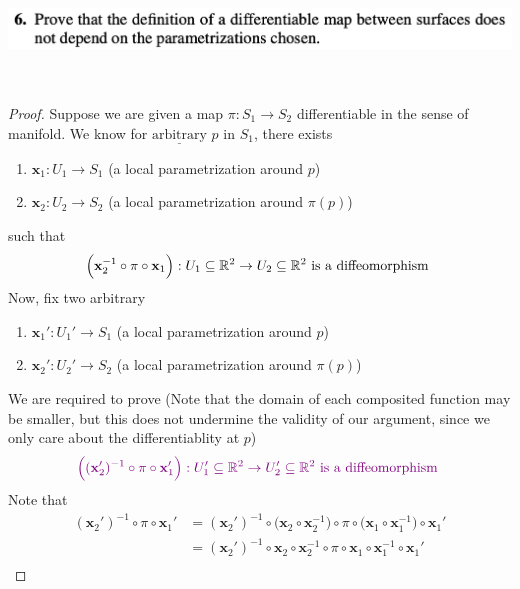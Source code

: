 \documentclass{report}
\begin{document}
\begin{question}{}{}
\includegraphics[height=3cm,width=18cm]{HW3a4}
\end{question}
\begin{proof}
Suppose we are given a map $\pi:S_1\rightarrow S_2$ differentiable in the sense of manifold. We know for $\underline{\text{arbitrary}}$ $p$ in  $S_1$, there exists 
\begin{enumerate}[label=(\alph*)]
  \item $\textbf{x}_1:U_1\rightarrow S_1$ (a local parametrization around $p$)
  \item $\textbf{x}_2:U_2\rightarrow S_2$ (a local parametrization around $\pi(p)$)
\end{enumerate}
such that 
\begin{align}
\label{dife}
\Big(\textbf{x}_2^{-1}\circ \pi \circ \textbf{x}_1 \Big):U_1\subseteq \mathbb{R}^2\rightarrow U_2\subseteq \mathbb{R}^2\text{ is a diffeomorphism }
\end{align}
Now, fix two arbitrary 
\begin{enumerate}[label=(\alph*)]
  \item  $\textbf{x}_1':U_1'\rightarrow S_1$ (a local parametrization around $p$)
  \item $\textbf{x}_2':U_2'\rightarrow S_2$ (a local parametrization around $\pi(p)$)
\end{enumerate}
We are required to prove (Note that the domain of each composited function may be smaller, but this does not undermine the validity of our argument, since we only care about the differentiablity at $p$) 
\begin{align*}
\textcolor{violet}{\Big((\textbf{x}_2')^{-1}\circ \pi \circ \textbf{x}_1' \Big):U_1'\subseteq \mathbb{R}^2\rightarrow U_2'\subseteq \mathbb{R}^2\text{ is a diffeomorphism  }}
\end{align*}
Note that 
\begin{align*}
  (\textbf{x}_2')^{-1}\circ \pi \circ \textbf{x}_1' &=(\textbf{x}_2')^{-1}\circ \big( \textbf{x}_2 \circ  \textbf{x}_2^{-1} \big)\circ \pi \circ \big( \textbf{x}_1 \circ \textbf{x}_1^{-1}  \big)\circ  \textbf{x}_1'\\
  &=(\textbf{x}_2')^{-1}\circ \textbf{x}_2 \circ  \textbf{x}_2^{-1} \circ \pi \circ  \textbf{x}_1 \circ \textbf{x}_1^{-1} \circ  \textbf{x}_1'\\\

\end{align*}
\end{proof}
\end{document}
